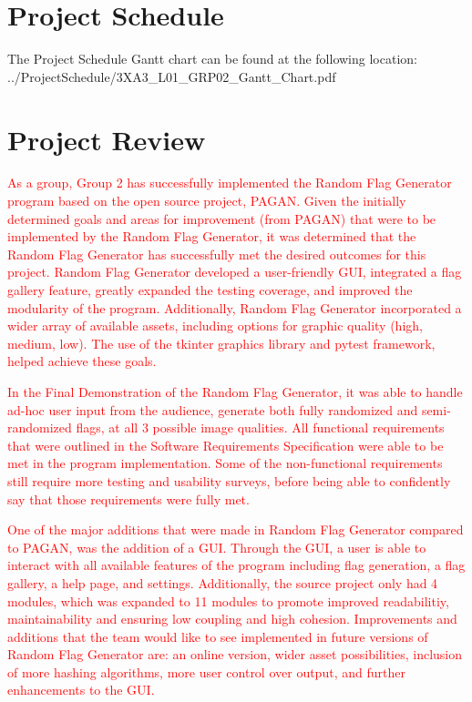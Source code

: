 \documentclass{article}
\begin{document}
\section{Project Schedule}

The Project Schedule Gantt chart can be found at the following location:\\
../ProjectSchedule/3XA3\_L01\_GRP02\_Gantt\_Chart.pdf

\section{Project Review}
\textcolor{red}{As a group, Group 2 has successfully implemented the Random Flag Generator program based on the open source project, PAGAN.
Given the initially determined goals and areas for improvement (from PAGAN) that were to be implemented by the Random Flag Generator, it was determined that
the Random Flag Generator has successfully met the desired outcomes for this project. Random Flag Generator developed a user-friendly GUI,
integrated a flag gallery feature, greatly expanded the testing coverage, and improved the modularity of the program. Additionally,
Random Flag Generator incorporated a wider array of available assets, including options for graphic quality (high, medium, low).
The use of the tkinter graphics library and pytest framework, helped achieve these goals.}

\textcolor{red}{In the Final Demonstration of the Random Flag Generator, it was able to handle ad-hoc user input from the audience,
generate both fully randomized and semi-randomized flags, at all 3 possible image qualities. All functional requirements that were outlined 
in the Software Requirements Specification were able to be met in the program implementation. Some of the non-functional requirements still require more 
testing and usability surveys, before being able to confidently say that those requirements were fully met.} 

\textcolor{red}{One of the major additions that were made in Random Flag Generator compared to PAGAN, was the addition of a GUI.
Through the GUI, a user is able to interact with all available features of the program including flag generation, a flag gallery, a help page, and settings.
Additionally, the source project only had 4 modules, which was expanded to 11 modules to promote improved readabilitiy, maintainability and ensuring low coupling and high cohesion.
Improvements and additions that the team would like to see implemented in future versions of Random Flag Generator are: an online version, wider asset possibilities, inclusion of 
more hashing algorithms, more user control over output, and further enhancements to the GUI.}
\end{document}
